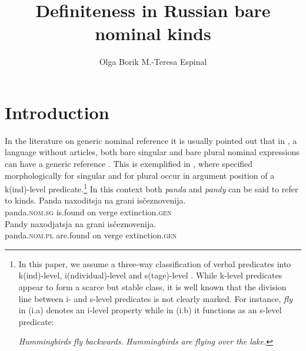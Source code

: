 \documentclass[output=paper
,modfonts
,nonflat]{langsci/langscibook}
\title{Definiteness in Russian bare nominal kinds}
\author{%
	Olga Borik\affiliation{UNED}\lastand 
	M.-Teresa Espinal\affiliation{UAB}
}
\begin{document}
	
	
	
	\maketitle
	\section{Introduction} \label{sec:borik:1}
	In the literature on generic nominal reference it is usually pointed out that in , a language without articles, both bare singular and bare plural nominal expressions can have a generic reference \citep{Chierchia1998,Doron2003,Dayal2004}. This is exemplified in , where  specified morphologically for singular  and for plural  occur in argument position of a k(ind)-level predicate.\footnote{In this paper, we assume a three-way classification of verbal predicates into k(ind)-level, i(ndividual)-level and s(tage)-level \citep{Carlson1977}. While k-level predicates appear to form a scarce but stable class, it is well known that the division line between i- and s-level predicates is not clearly marked. For instance, \textit{fly} in (i.a) denotes an i-level property while in (i.b) it functions as an s-level predicate: 
		
	\ea\label{ex:borik:i}
		\ea\label{ex:borik:ia} \textit{Hummingbirds fly backwards.}
		\ex\label{ex:borik:ib} \textit{Hummingbirds are flying over the lake.}
		\z
	\z}
	\newpage
	In this context both \textit{panda} and \textit{pandy} can be said to refer to kinds. 
	\ea\label{ex:borik:1}
	\ea\label{ex:borik:1a}{
		\gll Panda naxoditsja		na		grani			is\v{c}eznovenija.\\ 
		panda.\textsc{nom.sg} is.found on verge extinction.\textsc{gen}\\
	}
	\ex\label{ex:borik:1b}{
		\gll Pandy		naxodjatsja	na	grani	is\v{c}eznovenija. \\
		panda.\textsc{nom.pl} 	are.found 	on	verge	extinction.\textsc{gen}\\
	}
	\z
	\z
	
\end{document}
